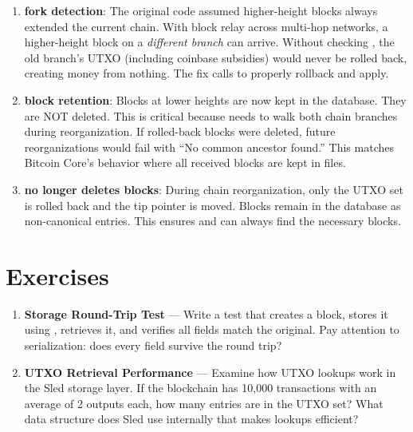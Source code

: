 \begin{notebox}
\begin{enumerate}
  \item \textbf{ fork detection}: The original code assumed higher-height blocks always extended the current chain. With block relay across multi-hop networks, a higher-height block on a \emph{different branch} can arrive. Without checking , the old branch's UTXO (including coinbase subsidies) would never be rolled back, creating money from nothing. The fix calls  to properly rollback and apply.

  \item \textbf{ block retention}: Blocks at lower heights are now kept in the database. They are NOT deleted. This is critical because  needs to walk both chain branches during reorganization. If rolled-back blocks were deleted, future reorganizations would fail with ``No common ancestor found.'' This matches Bitcoin Core's behavior where all received blocks are kept in  files.

  \item \textbf{ no longer deletes blocks}: During chain reorganization, only the UTXO set is rolled back and the tip pointer is moved. Blocks remain in the database as non-canonical entries. This ensures  and  can always find the necessary blocks.
\end{enumerate}
\end{notebox}

\section{Exercises}
\label{sec:ch11-exercises}

\begin{enumerate}
  \item \textbf{Storage Round-Trip Test} --- Write a test that creates a block, stores it using , retrieves it, and verifies all fields match the original. Pay attention to serialization: does every field survive the round trip?

  \item \textbf{UTXO Retrieval Performance} --- Examine how UTXO lookups work in the Sled storage layer. If the blockchain has 10,000 transactions with an average of 2 outputs each, how many entries are in the UTXO set? What data structure does Sled use internally that makes lookups efficient?
\end{enumerate}

